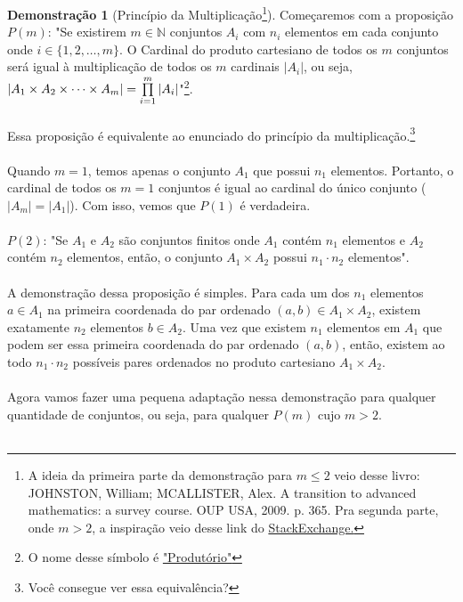 \documentclass[a4paper,11pt]{book}
\theoremstyle{definition}
\theoremstyle{break}
\newtheorem{demonstration}{Demonstração}[section]
\begin{document}
\begin{demonstration}[Princípio da Multiplicação\footnote{A ideia da primeira parte da demonstração para $m \leq 2$ veio desse livro: JOHNSTON, William; MCALLISTER, Alex. A transition to advanced mathematics: a survey course. OUP USA, 2009. p. 365. Pra segunda parte, onde $m > 2$, a inspiração veio desse link do 
\href{https://math.stackexchange.com/questions/3053969/using-induction-to-prove-the-multiplication-rule}{StackExchange.}}]

Começaremos com a proposição $P(m)$: "Se existirem $m \in \mathbb{N}$ conjuntos $A_i$ com $n_i$ elementos em cada conjunto onde $i \in \{1,2,\dots,m\}$. O Cardinal do produto cartesiano de todos os $m$ conjuntos será igual à multiplicação de todos os $m$ cardinais $| A_i|$, ou seja, $ |A_1 \times A_2 \times \dots \times A_m | = \prod_{i = 1}^{m}\limits | A_i | $"\footnote{O nome desse símbolo é \href{https://en.wikipedia.org/wiki/Multiplication\#Product_of_a_sequence}{"Produtório"}}.
\\
\\
Essa proposição é equivalente ao enunciado do princípio da multiplicação.\footnote{Você consegue ver essa equivalência?}
\\
\\
Quando $m = 1$, temos apenas o conjunto $A_1$ que possui $n_1$ elementos. Portanto, o cardinal de todos os $m = 1$ conjuntos é igual ao cardinal do único conjunto ($|A_m| = |A_1|$). Com isso, vemos que $P(1)$ é verdadeira.
\\
\\
$P(2)$: "Se $A_1$ e $A_2$ são conjuntos finitos onde $A_1$ contém $n_1$ elementos e $A_2$ contém $n_2$ elementos, então, o conjunto $A_1 \times A_2$ possui $n_1 \cdot n_2$ elementos".
\\
\\
A demonstração dessa proposição é simples. Para cada um dos $n_1$ elementos $a \in A_1$ na primeira coordenada do par ordenado $(a,b) \in A_1 \times A_2$, existem exatamente $n_2$ elementos $b \in A_2$. Uma vez que existem $n_1$ elementos em $A_1$ que podem ser essa primeira coordenada do par ordenado $(a,b)$, então, existem ao todo $n_1 \cdot n_2$ possíveis pares ordenados no produto cartesiano $A_1 \times A_2$.
\\
\\
Agora vamos fazer uma pequena adaptação nessa demonstração para qualquer quantidade de conjuntos, ou seja, para qualquer $P(m)$ cujo $m > 2$.
\\
\\

\end{demonstration}
\end{document}
